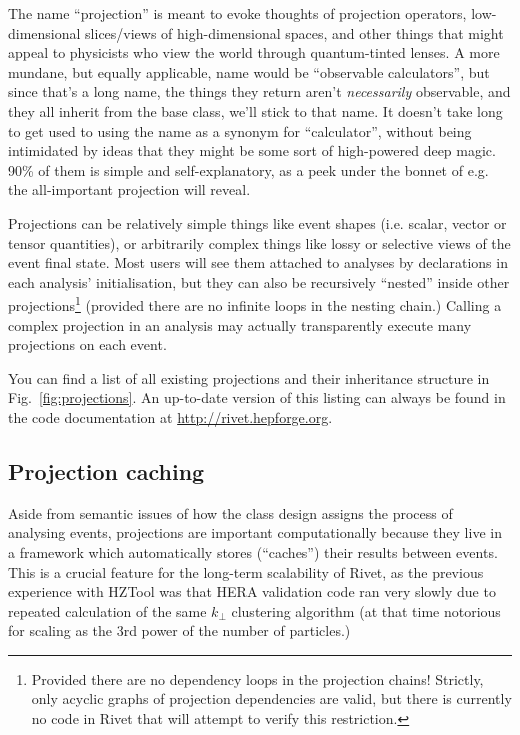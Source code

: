 The name ``projection'' is meant to evoke thoughts of projection operators,
low-dimensional slices/views of high-dimensional spaces, and other things that
might appeal to physicists who view the world through quantum-tinted lenses. A
more mundane, but equally applicable, name would be ``observable calculators'',
but since that's a long name, the things they return aren't \emph{necessarily}
observable, and they all inherit from the  base class, we'll
stick to that name. It doesn't take long to get used to using the name as a
synonym for ``calculator'', without being intimidated by ideas that they might
be some sort of high-powered deep magic. 90\% of them is simple and
self-explanatory, as a peek under the bonnet of e.g. the all-important
 projection will reveal.

Projections can be relatively simple things like event shapes (i.e. scalar,
vector or tensor quantities), or arbitrarily complex things like lossy or
selective views of the event final state. Most users will see them attached to
analyses by declarations in each analysis' initialisation, but they can also be
recursively ``nested'' inside other projections\footnote{Provided there are no
  dependency loops in the projection chains! Strictly, only acyclic graphs of
  projection dependencies are valid, but there is currently no code in Rivet
  that will attempt to verify this restriction.} (provided there are no infinite
loops in the nesting chain.) Calling a complex projection in an analysis may
actually transparently execute many projections on each event.

You can find a list of all existing projections and their inheritance structure
in Fig.~\ref{fig:projections}. An up-to-date version of this listing can always
be found in the code documentation at \url{http://rivet.hepforge.org}.


\subsection{Projection caching}

Aside from semantic issues of how the class design assigns the process of
analysing events, projections are important computationally because they live in
a framework which automatically stores (``caches'') their results between
events. This is a crucial feature for the long-term scalability of Rivet, as the
previous experience with HZTool was that HERA validation code ran very slowly
due to repeated calculation of the same $k_\perp$ clustering algorithm (at that
time notorious for scaling as the 3rd power of the number of particles.)

